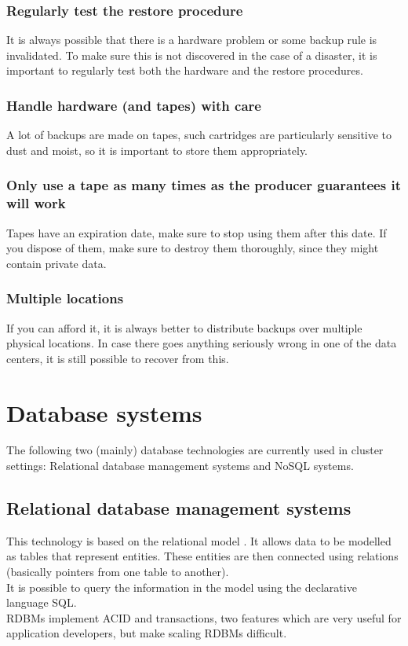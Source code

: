 \documentclass[12pt]{report}
\begin{document}
\subsubsection{Regularly test the restore procedure}
It is always possible that there is a hardware problem or some backup
rule is invalidated. To make sure this is not discovered in the case
of a disaster, it is important to regularly test both the hardware and
the restore procedures.

\subsubsection{Handle hardware (and tapes) with care}
A lot of backups are made on tapes, such cartridges are particularly
sensitive to dust and moist, so it is important to store them
appropriately.

\subsubsection{Only use a tape as many times as the producer
  guarantees it will work}
Tapes have an expiration date, make sure to stop using them after this
date. If you dispose of them, make sure to destroy them thoroughly,
since they might contain private data.

\subsubsection{Multiple locations}
If you can afford it, it is always better to distribute backups over
multiple physical locations. In case there goes anything seriously
wrong in one of the data centers, it is still possible to recover from
this.

\section{Database systems}
The following two (mainly) database technologies are currently used in cluster
settings: Relational database management systems and NoSQL systems.

\subsection{Relational database management systems}
This technology is based on the relational model \cite{codd}. It
allows data to be modelled as tables that represent entities. These
entities are then connected using relations (basically pointers from
one table to another).\\
It is possible to query the information in the model using the
declarative language SQL.\\
RDBMs implement ACID
and transactions, two features which are very
useful for application developers, but make scaling RDBMs difficult.
\end{document}
